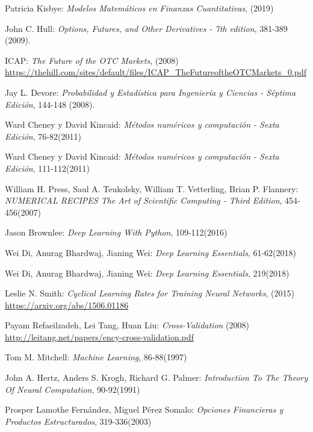 \documentclass[a4paper,openright, 12pt, oneside]{book}
\begin{document}
\begin{thebibliography}{X}

  Patricia Kisbye:
  \emph{Modelos Matemáticos en Finanzas Cuantitativas},
  (2019)

  John C. Hull:
  \emph{Options, Futures, and Other Derivatives - 7th edition},
  381-389 (2009).

  ICAP:
  \emph{The Future of the OTC Markets},
   (2008) \url{https://thehill.com/sites/default/files/ICAP\_TheFutureoftheOTCMarkets\_0.pdf}


  Jay L. Devore:
  \emph{Probabilidad y Estadística para Ingeniería y Ciencias - Séptima Edición},
  144-148 (2008).


  Ward Cheney y David Kincaid:
  \emph{Métodos numéricos y computación - Sexta Edición},
  76-82(2011)

  Ward Cheney y David Kincaid:
  \emph{Métodos numéricos y computación - Sexta Edición},
  111-112(2011)

  William H. Press, Saul A. Teukolsky, William T. Vetterling, Brian P. Flannery:
  \emph{NUMERICAL RECIPES The Art of Scientific Computing - Third Edition},
  454-456(2007)


  Jason Brownlee:
  \emph{Deep Learning With Python},
  109-112(2016)

  Wei Di, Anurag Bhardwaj, Jianing Wei:
  \emph{Deep Learning Essentials},
  61-62(2018)

  Wei Di, Anurag Bhardwaj, Jianing Wei:
  \emph{Deep Learning Essentials},
  219(2018)

  Leslie N. Smith:
  \emph{Cyclical Learning Rates for Training Neural Networks},
  (2015) \url{https://arxiv.org/abs/1506.01186}

  Payam Refaeilzadeh, Lei Tang, Huan Liu:
  \emph{Cross-Validation}
  (2008) \url{http://leitang.net/papers/ency-cross-validation.pdf}

  Tom M. Mitchell:
  \emph{Machine Learning}, 
  86-88(1997)

  John A. Hertz, Anders S. Krogh, Richard G. Palmer:
  \emph{Introduction To The Theory Of Neural Computation}, 
  90-92(1991)

  Prosper Lamothe Fernández, Miguel Pérez Somalo:
  \emph{Opciones Financieras y Productos Estructurados},
  319-336(2003)


\end{thebibliography}
\end{document}

